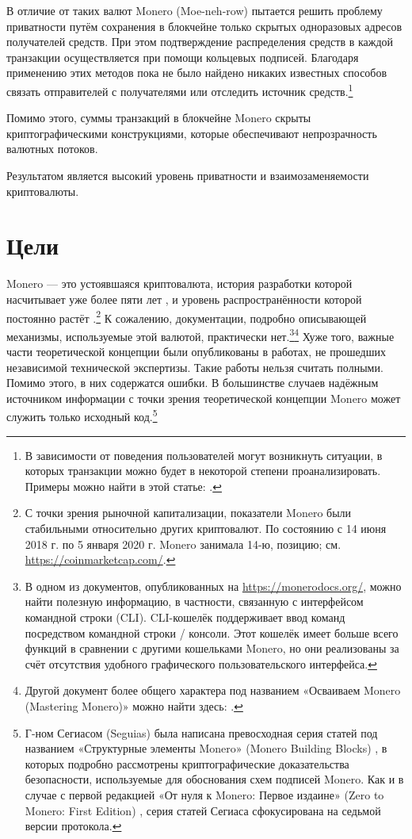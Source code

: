 В отличие от таких валют Monero (Moe-neh-row) пытается решить проблему приватности путём сохранения в блокчейне только скрытых одноразовых адресов получателей средств. При этом подтверждение распределения средств в каждой транзакции осуществляется при помощи кольцевых подписей. Благодаря применению этих методов пока не было найдено никаких известных способов связать отправителей с получателями или отследить источник средств.\footnote{В зависимости от поведения пользователей могут возникнуть ситуации, в которых транзакции можно будет в некоторой степени проанализировать. Примеры можно найти в этой статье: \cite{monero-ring-heuristics-ryo}.}

Помимо этого, суммы транзакций в блокчейне Monero скрыты криптографическими конструк\-циями, которые обеспечивают непрозрачность валютных потоков.

Результатом является высокий уровень приватности и взаимозаменяемости криптовалюты.



\section{Цели}
\label{sec:goals}

Monero — это устоявшаяся криптовалюта, история разработки которой насчитывает уже более пяти лет \cite{bitmonero-launched, monero-history}, и уровень распространённости которой постоянно растёт \cite{justin-defcon-2019-community-growth}.\footnote{\label{marketcap_note}С точки зрения рыночной капитализации, показатели Monero были стабильными относительно других криптовалют. По состоянию с 14 июня 2018 г. по 5 января 2020 г. Monero занимала 14-ю, позицию; см. \url{https://coinmarketcap.com/}.} К сожалению, документации, подробно описывающей механизмы, используемые этой валютой, практически нет.\footnote{В одном из документов, опубликованных на \url{https://monerodocs.org/}, можно найти полезную информацию, в частности, связанную с интерфейсом командной строки (CLI). CLI-кошелёк поддерживает ввод команд посредством командной строки / консоли. Этот кошелёк имеет больше всего функций в сравнении с другими кошельками Monero, но они реализованы за счёт отсутствия удобного графического пользовательского интерфейса.}\footnote{Другой документ более общего характера под названием «Осваиваем Monero (Mastering Monero)» можно найти здесь: \cite{mastering-monero}.} Хуже того, важные части теоретической концепции были опубликованы в работах, не прошедших независимой технической экспертизы. Такие работы нельзя считать полными. Помимо этого, в них содержатся ошибки. В большинстве случаев надёжным источником информации с точки зрения теоретической концепции Monero может служить только исходный код.\footnote{Г-ном Сегиасом (Seguias) была написана превосходная серия статей под названием «Структурные элементы Monero» (Monero Building Blocks) \cite{monero-building-blocks}, в которых подробно рассмотрены криптографические доказательства безопасности, используемые для обоснования схем подписей Monero. Как и в случае с первой редакцией «От нуля к Monero: Первое издаине» (Zero to Monero: First Edition) \cite{ztm-1}, серия статей Сегиаса сфокусирована на седьмой версии протокола.}

